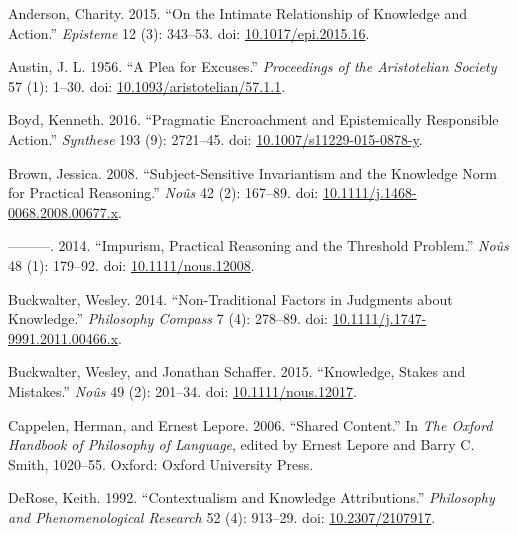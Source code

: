 \documentclass[
  10pt,
  letterpaper,
  DIV=11,
  numbers=noendperiod,
  twoside]{scrartcl}
\newlength{\cslhangindent}
\newenvironment{CSLReferences}[2] %
 {\begin{list}{}{%
  \setlength{\itemindent}{0pt}
  \setlength{\leftmargin}{0pt}
  \setlength{\parsep}{0pt}
  \ifodd #1
   \setlength{\leftmargin}{\cslhangindent}
   \setlength{\itemindent}{-1\cslhangindent}
  \fi
  \setlength{\itemsep}{#2\baselineskip}}}
 {\end{list}}
\begin{document}
\label{refs}
\begin{CSLReferences}{1}{0}
Anderson, Charity. 2015. {``On the Intimate Relationship of Knowledge
and Action.''} \emph{Episteme} 12 (3): 343--53. doi:
\href{https://doi.org/10.1017/epi.2015.16}{10.1017/epi.2015.16}.

Austin, J. L. 1956. {``A Plea for Excuses.''} \emph{Proceedings of the
Aristotelian Society} 57 (1): 1--30. doi:
\href{https://doi.org/10.1093/aristotelian/57.1.1}{10.1093/aristotelian/57.1.1}.

Boyd, Kenneth. 2016. {``Pragmatic Encroachment and Epistemically
Responsible Action.''} \emph{Synthese} 193 (9): 2721--45. doi:
\href{https://doi.org/10.1007/s11229-015-0878-y}{10.1007/s11229-015-0878-y}.

Brown, Jessica. 2008. {``Subject-Sensitive Invariantism and the
Knowledge Norm for Practical Reasoning.''} \emph{No{û}s} 42 (2):
167--89. doi:
\href{https://doi.org/10.1111/j.1468-0068.2008.00677.x}{10.1111/j.1468-0068.2008.00677.x}.

---------. 2014. {``Impurism, Practical Reasoning and the Threshold
Problem.''} \emph{No{û}s} 48 (1): 179--92. doi:
\href{https://doi.org/10.1111/nous.12008}{10.1111/nous.12008}.

Buckwalter, Wesley. 2014. {``Non-Traditional Factors in Judgments about
Knowledge.''} \emph{Philosophy Compass} 7 (4): 278--89. doi:
\href{https://doi.org/10.1111/j.1747-9991.2011.00466.x}{10.1111/j.1747-9991.2011.00466.x}.

Buckwalter, Wesley, and Jonathan Schaffer. 2015. {``Knowledge, Stakes
and Mistakes.''} \emph{No{û}s} 49 (2): 201--34. doi:
\href{https://doi.org/10.1111/nous.12017}{10.1111/nous.12017}.

Cappelen, Herman, and Ernest Lepore. 2006. {``Shared Content.''} In
\emph{The Oxford Handbook of Philosophy of Language}, edited by Ernest
Lepore and Barry C. Smith, 1020--55. Oxford: Oxford University Press.

DeRose, Keith. 1992. {``Contextualism and Knowledge Attributions.''}
\emph{Philosophy and Phenomenological Research} 52 (4): 913--29. doi:
\href{https://doi.org/10.2307/2107917}{10.2307/2107917}.


\end{CSLReferences}
\end{document}
